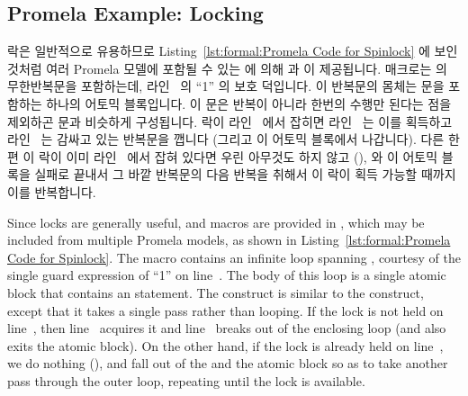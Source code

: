 \iffalse

Now we are ready for further examples.

\fi

\subsection{Promela Example: Locking}
\label{sec:formal:Promela Example: Locking}

\begin{fcvref}
락은 일반적으로 유용하므로
Listing~\ref{lst:formal:Promela Code for Spinlock} 에 보인 것처럼 여러 Promela
모델에 포함될 수 있는  에 의해  과
 이 제공됩니다.
 매크로는  의 
무한반복문을 포함하는데, 라인~ 의 ``1'' 의 보호 덕입니다.
이 반복문의 몸체는  문을 포함하는 하나의 어토믹 블록입니다.
이  문은 반복이 아니라 한번의 수행만 된다는 점을 제외하곤 
문과 비슷하게 구성됩니다.
락이 라인~ 에서 잡히면 라인~ 는 이를 획득하고
라인~ 는 감싸고 있는  반복문을 깹니다 (그리고 이 어토믹
블록에서 나갑니다).
다른 한편 이 락이 이미 라인~ 에서 잡혀 있다면 우린 아무것도 하지
않고 (),  와 이 어토믹 블록을 실패로 끝내서 그 바깥 반복문의
다음 반복을 취해서 이 락이 획득 가능할 때까지 이를 반복합니다.
\end{fcvref}

\iffalse

\begin{fcvref}
Since locks are generally useful,  and
macros are provided in , which may be included from
multiple Promela models, as shown in
Listing~\ref{lst:formal:Promela Code for Spinlock}.
The  macro contains an infinite  loop
spanning ,
courtesy of the single guard expression of ``1'' on line~.
The body of this loop is a single atomic block that contains
an  statement.
The  construct is similar to the  construct, except
that it takes a single pass rather than looping.
If the lock is not held on line~, then
line~ acquires it and
line~ breaks out of the enclosing  loop (and also exits
the atomic block).
On the other hand, if the lock is already held on line~,
we do nothing (), and fall out of the  and the
atomic block so as to take another pass through the outer
loop, repeating until the lock is available.
\end{fcvref}

